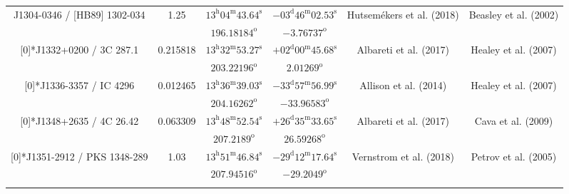 \begin{landscape}
\begin{longtable}{cccccc}
  \multirow{2}[0]{*}{J1304-0346 / [HB89] 1302-034} & \multirow{2}[0]{*}{1.25} &  
    $13^\text{h}04^\text{m}43.64^\text{s}$  & $-03^\text{d}46^\text{m}02.53^\text{s}$  & 
    \multirow{2}[0]{*}{Hutsem{\'e}kers et al. (2018)\cite{RedRef53_2018}}& \multirow{2}[0]{*}{Beasley et al. (2002)\cite{CoordRef4_2002}} \\*
    & & $196.18184^\text{o}$ & $-3.76737^\text{o}$ & & \\ \addlinespace 

  \multirow{2}[0]{*}{J1332+0200 / 3C 287.1} & \multirow{2}[0]{*}{0.215818} &  
    $13^\text{h}32^\text{m}53.27^\text{s}$  & $+02^\text{d}00^\text{m}45.68^\text{s}$  & 
    \multirow{2}[0]{*}{Albareti et al. (2017) \cite{RedRef9_2017}}& \multirow{2}[0]{*}{Healey et al. (2007)\cite{CoordRef54_2007}} \\*
    & & $203.22196^\text{o}$ & $2.01269^\text{o}$ & & \\ \addlinespace 

  \multirow{2}[0]{*}{J1336-3357 / IC 4296} & \multirow{2}[0]{*}{0.012465} &  
    $13^\text{h}36^\text{m}39.03^\text{s}$  & $-33^\text{d}57^\text{m}56.99^\text{s}$  & 
    \multirow{2}[0]{*}{Allison et al. (2014) \cite{RedRef23_2014}}& \multirow{2}[0]{*}{Healey et al. (2007)\cite{CoordRef54_2007}} \\*
     & & $204.16262^\text{o}$ & $-33.96583^\text{o}$ & & \\ \addlinespace 

  \multirow{2}[0]{*}{J1348+2635 / 4C 26.42} & \multirow{2}[0]{*}{0.063309} &  
    $13^\text{h}48^\text{m}52.54^\text{s} $  & $+26^\text{d}35^\text{m}33.65^\text{s} $  & 
    \multirow{2}[0]{*}{Albareti et al. (2017)\cite{RedRef9_2017}}& \multirow{2}[0]{*}{Cava et al. (2009)\cite{CoordRef56_2009}} \\*
    & & $207.2189^\text{o}$ & $26.59268^\text{o}$ & & \\ \addlinespace 

  \multirow{2}[0]{*}{J1351-2912 / PKS 1348-289} & \multirow{2}[0]{*}{1.03} &  
    $13^\text{h}51^\text{m}46.84^\text{s} $  & $-29^\text{d}12^\text{m}17.64^\text{s} $  & 
    \multirow{2}[0]{*}{Vernstrom et al. (2018)\cite{RedRef57_2018}}& \multirow{2}[0]{*}{Petrov et al. (2005) \cite{CoordRef35_2005}} \\*
     & & $207.94516^\text{o}$ & $-29.2049^\text{o}$ & & \\ \addlinespace 


\end{longtable}
\end{landscape}
